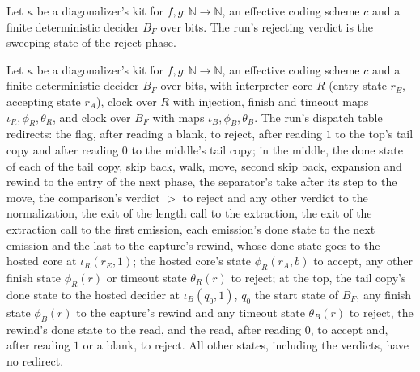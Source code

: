 \begin{definition}
\label{Turing.NTimeDiag.dzRej}
\leanok
{}
Let $\kappa$ be a diagonalizer's kit for $f, g : \mathbb{N} \to \mathbb{N}$, an effective coding scheme $c$ and a finite deterministic decider $B_F$ over bits. The run's rejecting verdict is the sweeping state of the reject phase.
\end{definition}

\begin{definition}
\label{Turing.NTimeDiag.dzQRed}
\leanok
{}
Let $\kappa$ be a diagonalizer's kit for $f, g : \mathbb{N} \to \mathbb{N}$, an effective coding scheme $c$ and a finite deterministic decider $B_F$ over bits, with interpreter core $R$ (entry state $r_E$, accepting state $r_A$), clock over $R$ with injection, finish and timeout maps $\iota_R, \phi_R, \theta_R$, and clock over $B_F$ with maps $\iota_B, \phi_B, \theta_B$. The run's dispatch table redirects: the flag, after reading a blank, to reject, after reading $1$ to the top's tail copy and after reading $0$ to the middle's tail copy; in the middle, the done state of each of the tail copy, skip back, walk, move, second skip back, expansion and rewind to the entry of the next phase, the separator's take after its step to the move, the comparison's verdict $>$ to reject and any other verdict to the normalization, the exit of the length call to the extraction, the exit of the extraction call to the first emission, each emission's done state to the next emission and the last to the capture's rewind, whose done state goes to the hosted core at $\iota_R(r_E, 1)$; the hosted core's state $\phi_R(r_A, b)$ to accept, any other finish state $\phi_R(r)$ or timeout state $\theta_R(r)$ to reject; at the top, the tail copy's done state to the hosted decider at $\iota_B(q_0, 1)$, $q_0$ the start state of $B_F$, any finish state $\phi_B(r)$ to the capture's rewind and any timeout state $\theta_B(r)$ to reject, the rewind's done state to the read, and the read, after reading $0$, to accept and, after reading $1$ or a blank, to reject. All other states, including the verdicts, have no redirect.
\end{definition}

